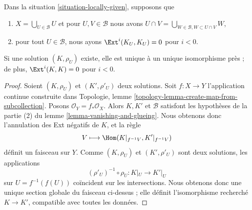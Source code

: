 \begin{lemma}

\label{lemma-uniqueness}
Dans la situation \ref{situation-locally-given}, supposons que
\begin{enumerate}
\item $X = \bigcup_{U \in \mathcal{B}} U$ et pour $U, V \in \mathcal{B}$ nous avons $U \cap V = \bigcup_{W \in \mathcal{B}, W \subset U \cap V} W$,
\item pour tout $U \in \mathcal{B}$, nous ayons $\Ext^i(K_U, K_U) = 0$ pour $i < 0$.
\end{enumerate}
Si une solution $(K, \rho_U)$ existe, elle est unique à un unique isomorphisme près ; de plus, $\Ext^i(K, K) = 0$ pour $i < 0$.
\end{lemma}

\begin{proof}

Soient $(K, \rho_U)$ et $(K', \rho'_U)$ deux solutions. Soit $f : X \to Y$ l'application continue construite dans Topologie, lemme \ref{topology-lemma-create-map-from-subcollection}. Posons $\mathcal{O}_Y = f_*\mathcal{O}_X$. Alors $K, K'$ et $\mathcal{B}$ satisfont les hypothèses de la partie (2) du lemme \ref{lemma-vanishing-and-glueing}. Nous obtenons donc l'annulation des Ext négatifs de $K$, et la règle
$$
V \longmapsto \Hom(K|_{f^{-1}V}, K'|_{f^{-1}V})
$$
définit un faisceau sur $Y$. Comme $(K, \rho_U)$ et $(K', \rho'_U)$ sont deux solutions, les applications
$$
(\rho'_U)^{-1} \circ \rho_U : K|_U \longrightarrow K'|_U
$$
sur $U = f^{-1}(f(U))$ coïncident sur les intersections. Nous obtenons donc une unique section globale du faisceau ci-dessus ; elle définit l'isomorphisme recherché
$K \to K'$, compatible avec toutes les données.

\end{proof}

